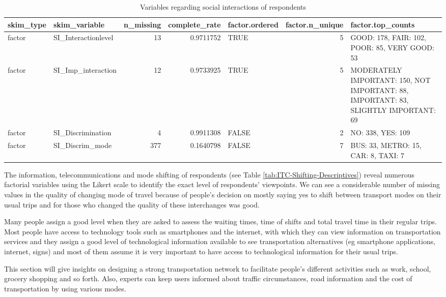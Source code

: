 \documentclass[
11pt, %
oneside, %
english, %
singlespacing, %
]{macthesis} %
\newcommand{\blandscape}{\begin{landscape}}
\newcommand{\elandscape}{\end{landscape}}
\begin{document}
\newpage
\blandscape
\begin{table}

\caption{\label{tab:unnamed-chunk-12}\label{tab:Social-Interaction-Descriptives}Variables regarding social interactions of respondents}
\centering
\fontsize{7}{9}\selectfont
\begin{tabular}[t]{llrrlr>{\raggedright\arraybackslash}p{10em}}
\toprule
skim\_type & skim\_variable & n\_missing & complete\_rate & factor.ordered & factor.n\_unique & factor.top\_counts\\
\midrule
factor & SI\_Interactionlevel & 13 & 0.9711752 & TRUE & 5 & GOOD: 178, FAIR: 102, POOR: 85, VERY GOOD: 53\\
factor & SI\_Imp\_interaction & 12 & 0.9733925 & TRUE & 5 & MODERATELY IMPORTANT: 150, NOT IMPORTANT: 88, IMPORTANT: 83, SLIGHTLY IMPORTANT: 69\\
factor & SI\_Discrimination & 4 & 0.9911308 & FALSE & 2 & NO: 338, YES: 109\\
factor & SI\_Discrim\_mode & 377 & 0.1640798 & FALSE & 7 & BUS: 33, METRO: 15, CAR: 8, TAXI: 7\\
\bottomrule
\end{tabular}
\end{table}
\elandscape
\newpage

The information, telecommunications and mode shifting of respondents (see Table \ref{tab:ITC-Shifting-Descriptives}) reveal numerous factorial variables using the Likert scale to identify the exact level of respondents' viewpoints. We can see a considerable number of missing values in the quality of changing mode of travel because of people's decision on mostly saying yes to shift between transport modes on their usual trips and for those who changed the quality of these interchanges was good.

Many people assign a good level when they are asked to assess the waiting times, time of shifts and total travel time in their regular trips. Most people have access to technology tools such as smartphones and the internet, with which they can view information on transportation services and they assign a good level of technological information available to see transportation alternatives (eg smartphone applications, internet, signs) and most of them assume it is very important to have access to technological information for their usual trips.

This section will give insights on designing a strong transportation network to facilitate people's different activities such as work, school, grocery shopping and so forth. Also, experts can keep users informed about traffic circumstances, road information and the cost of transportation by using various modes.
\end{document}
